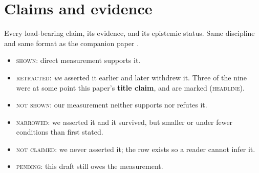 \documentclass[11pt]{article}
\begin{document}
\section{Claims and evidence}
\label{app:claims}

Every load-bearing claim, its evidence, and its epistemic status. Same discipline and
same format as the companion paper \citep{kwon2026factwash}.

\begin{itemize}\itemsep2pt
\item \textsc{shown}: direct measurement supports it.
\item \textsc{retracted}: \emph{we} asserted it earlier and later withdrew it. Three of
      the nine were at some point this paper's \textbf{title claim}, and are marked
      \textsc{(headline)}.
\item \textsc{not shown}: our measurement neither supports nor refutes it.
\item \textsc{narrowed}: we asserted it and it survived, but smaller or under fewer
      conditions than first stated.
\item \textsc{not claimed}: we never asserted it; the row exists so a reader cannot
      infer it.
\item \textsc{pending}: this draft still owes the measurement.
\end{itemize}
\end{document}
